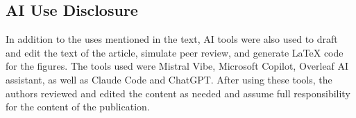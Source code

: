 \documentclass[runningheads]{llncs}
\begin{document}








\subsection*{AI Use Disclosure}

In addition to the uses mentioned in the text, AI tools were also used to draft and edit the text of the article, simulate peer review, and generate LaTeX code for the figures. The tools used were Mistral Vibe, Microsoft Copilot, Overleaf AI assistant, as well as Claude Code and ChatGPT. After using these tools, the authors reviewed and edited the content as needed and assume full responsibility for the content of the publication.

%
%
%
 
 
%
\end{document}
